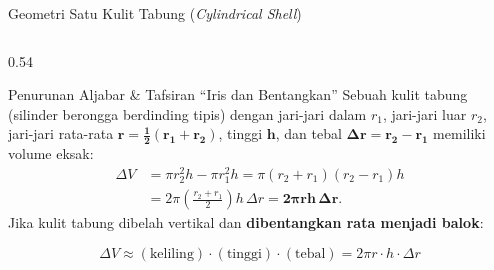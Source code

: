 \documentclass[aspectratio=43,10pt]{beamer}
\begin{document}
\begin{frame}{Geometri Satu Kulit Tabung (\textit{Cylindrical Shell})}
    \begin{columns}[c]
        \begin{column}{0.54\textwidth}
            \begin{block}{Penurunan Aljabar \& Tafsiran ``Iris dan Bentangkan''}
                \scriptsize\abovedisplayskip=2pt\belowdisplayskip=2pt
                Sebuah kulit tabung (silinder berongga berdinding tipis) dengan jari-jari dalam $r_1$, jari-jari luar $r_2$, jari-jari rata-rata $\mathbf{r = \frac{1}{2}(r_1 + r_2)}$, tinggi $\mathbf{h}$, dan tebal $\mathbf{\Delta r = r_2 - r_1}$ memiliki volume eksak:
                \begin{align*}
                    \Delta V &= \pi r_2^2 h - \pi r_1^2 h = \pi(r_2 + r_1)(r_2 - r_1)h\\
                    &= 2\pi\!\left(\frac{r_2 + r_1}{2}\right)\!h\,\Delta r = \mathbf{2\pi r h\,\Delta r}.
                \end{align*}
                Jika kulit tabung dibelah vertikal dan \textbf{dibentangkan rata menjadi balok}:
            \end{block}
            {\scriptsize$$\boxed{\;\Delta V \approx (\text{keliling})\cdot(\text{tinggi})\cdot(\text{tebal}) = 2\pi r \cdot h \cdot \Delta r\;}$$}
        \end{column}


\end{columns}
\end{frame}
\end{document}
